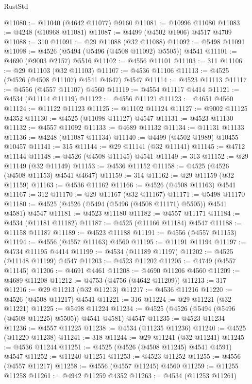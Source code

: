 \begin{lexlean}{RustStd}
\begin{coremodule}
@11080 := @11040 (@4642 @11077) @9160
@11081 := @10996 @11080
@11083 := @4248 (@10968 @11081)
@11087 := @4499 (@4502 @1906) @4517 @4709
@11088 := 310
@11091 := @29 @11088 (@32 @11088)
@11092 := @5498 @11091
@11098 := @4526 (@5494 (@5496 (@4508 @11092) @5505)) @4541
@11101 := @4690 (@9003 @2157) @5516
@11102 := @4556 @11101
@11103 := 311
@11106 := @29 @11103 (@32 @11103)
@11107 := @4536 @11106
@11113 := @4525 (@4526 (@4508 @11107) @4541 @4647) @4547
@11114 := @4523 @11113
@11117 := @4556 (@4557 @11107) @4560
@11119 := @4554 @11117 @4414
@11121 := @4534 (@11114 @11119)
@11122 := @4556 @11121
@11123 := @4651 @4560
@11124 := @11122 @11123
@11125 := @11102 @11124
@11127 := @9002 @11125 @4352
@11130 := @4525 (@11098 @11127) @4547
@11131 := @4523 @11130
@11132 := @4557 @11092
@11133 := @4689 @11132
@11134 := @11131 @11133
@11136 := @4248 (@11087 @11134)
@11140 := @4499 (@4502 @1989) @10455 @10457
@11141 := 315
@11144 := @29 @11141 (@32 @11141)
@11145 := @4712 @11144
@11148 := @4526 (@4508 @11145) @4541
@11149 := 313
@11152 := @29 @11149 (@32 @11149)
@11153 := @4536 @11152
@11158 := @4525 (@4526 (@4508 @11153) @4541 @4647)
@11159 := 314
@11162 := @29 @11159 (@32 @11159)
@11163 := @4536 @11162
@11166 := @4526 (@4508 @11163) @4541
@11167 := 312
@11170 := @29 @11167 (@32 @11167)
@11171 := @5498 @11170
@11180 := @4525 (@4526 (@5494 (@5496 (@4508 @11171) @5505)) @4541 @4581) @4547
@11181 := @4523 @11180
@11182 := @4557 @11171
@11184 := @4534 (@11181 @11182)
@11187 := @4525 (@11166 @11184) @4547
@11188 := @11158 @11187
@11189 := @4523 @11188
@11191 := @4556 (@4557 @11153)
@11194 := @4556 (@4557 @11163) @4560
@11195 := @11191 @11194
@11197 := @4734 @11195 @4414
@11199 := @4534 (@11189 @11197)
@11202 := @4525 (@11148 @11199) @4547
@11203 := @4523 @11202
@11205 := @4749 (@4557 @11145)
@11206 := @4691 @4461
@11208 := @4690 @11206 @4560
@11209 := @4689 @11208
@11212 := @4753 (@4756 (@4642 @11209))
@11213 := 317
@11216 := @29 @11213 (@32 @11213)
@11217 := @4536 @11216
@11220 := @4526 (@4508 @11217) @4541
@11221 := 316
@11224 := @29 @11221 (@32 @11221)
@11225 := @5498 @11224
@11234 := @4525 (@4526 (@5494 (@5496 (@4508 @11225) @5505)) @4541 @4581) @4547
@11235 := @4523 @11234
@11236 := @4557 @11225
@11238 := @4534 (@11235 @11236)
@11240 := @4525 (@11220 @11238)
@11241 := 318
@11244 := @29 @11241 (@32 @11241)
@11245 := @4536 @11244
@11251 := @4525 (@4526 (@4508 @11245) @4541 @4591) @4547
@11252 := @11240 @11251
@11253 := @4523 @11252
@11255 := @4556 (@4557 @11217)
@11258 := @4556 (@4557 @11245) @4560
@11259 := @11255 @11258
@11261 := @4942 @11259 @4352
@11263 := @4534 (@11253 @11261)

\end{coremodule}
\end{lexlean}
